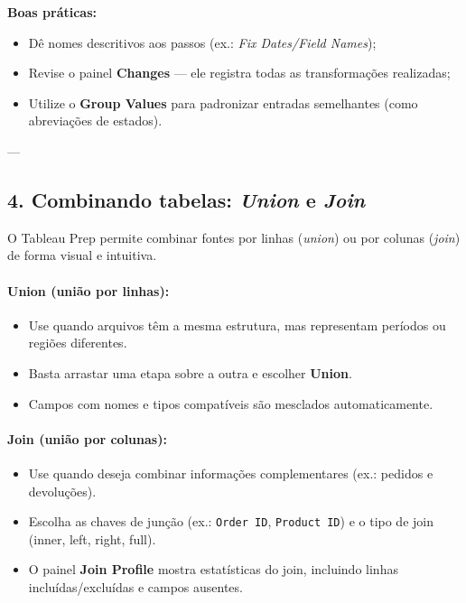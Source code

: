 \begin{NoteBox}
\textbf{Boas práticas:}
\begin{itemize}[leftmargin=*]
  \item Dê nomes descritivos aos passos (ex.: \textit{Fix Dates/Field Names});  
  \item Revise o painel \textbf{Changes} — ele registra todas as transformações realizadas;  
  \item Utilize o \textbf{Group Values} para padronizar entradas semelhantes (como abreviações de estados).
\end{itemize}
\end{NoteBox}

---

\subsection*{4. Combinando tabelas: \textit{Union} e \textit{Join}}

O Tableau Prep permite combinar fontes por linhas (\textit{union}) ou por colunas (\textit{join}) de forma visual e intuitiva.

\paragraph{Union (união por linhas):}
\begin{itemize}[leftmargin=*]
  \item Use quando arquivos têm a mesma estrutura, mas representam períodos ou regiões diferentes.
  \item Basta arrastar uma etapa sobre a outra e escolher \textbf{Union}.
  \item Campos com nomes e tipos compatíveis são mesclados automaticamente.
\end{itemize}

\paragraph{Join (união por colunas):}
\begin{itemize}[leftmargin=*]
  \item Use quando deseja combinar informações complementares (ex.: pedidos e devoluções).
  \item Escolha as chaves de junção (ex.: \texttt{Order ID}, \texttt{Product ID}) e o tipo de join (inner, left, right, full).
  \item O painel \textbf{Join Profile} mostra estatísticas do join, incluindo linhas incluídas/excluídas e campos ausentes.
\end{itemize}

